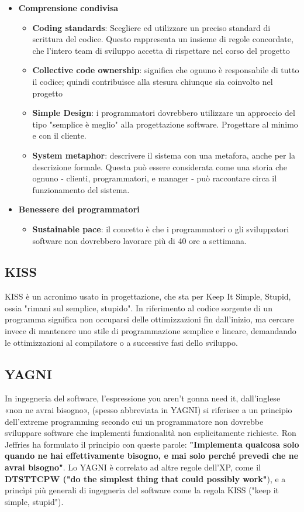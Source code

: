 \documentclass[11pt,a4paper]{book}
\begin{document}
\begin{itemize}
	\item \textbf{Comprensione condivisa}
	\begin{itemize}
		\item \textbf{Coding standards}: Scegliere ed utilizzare un preciso standard di scrittura del codice. Questo rappresenta un insieme di regole concordate, che l'intero team di sviluppo accetta di rispettare nel corso del progetto
		\item \textbf{Collective code ownership}: significa che ognuno è responsabile di tutto il codice; quindi contribuisce alla stesura chiunque sia coinvolto nel progetto
		\item \textbf{Simple Design}:  i programmatori dovrebbero utilizzare un approccio del tipo "semplice è meglio" alla progettazione software. Progettare al minimo e con il cliente.
		\item \textbf{System metaphor}: descrivere il sistema con una metafora, anche per la descrizione formale. Questa può essere considerata come una storia che ognuno - clienti, programmatori, e manager - può raccontare circa il funzionamento del sistema.	
	\end{itemize}
	
	\item \textbf{Benessere dei programmatori}
	\begin{itemize}
		\item \textbf{Sustainable pace}: il concetto è che i programmatori o gli sviluppatori software non dovrebbero lavorare più di 40 ore a settimana.
	\end{itemize}
\end{itemize}


\subsection{KISS}
KISS è un acronimo usato in progettazione, che sta per Keep It Simple, Stupid, ossia "rimani sul semplice, stupido". In riferimento al codice sorgente di un programma significa non occuparsi delle ottimizzazioni fin dall'inizio, ma cercare invece di mantenere uno stile di programmazione semplice e lineare, demandando le ottimizzazioni al compilatore o a successive fasi dello sviluppo.

\subsection{YAGNI}
In ingegneria del software, l'espressione you aren't gonna need it, dall'inglese «non ne avrai bisogno», (spesso abbreviata in YAGNI) si riferisce a un principio dell'extreme programming secondo cui un programmatore non dovrebbe sviluppare software che implementi funzionalità non esplicitamente richieste. Ron Jeffries ha formulato il principio con queste parole: \textbf{"Implementa qualcosa solo quando ne hai effettivamente bisogno, e mai solo perché prevedi che ne avrai bisogno"}. Lo YAGNI è correlato ad altre regole dell'XP, come il \textbf{DTSTTCPW ("do the simplest thing that could possibly work"}), e a princìpi più generali di ingegneria del software come la regola KISS ("keep it simple, stupid").
\end{document}
